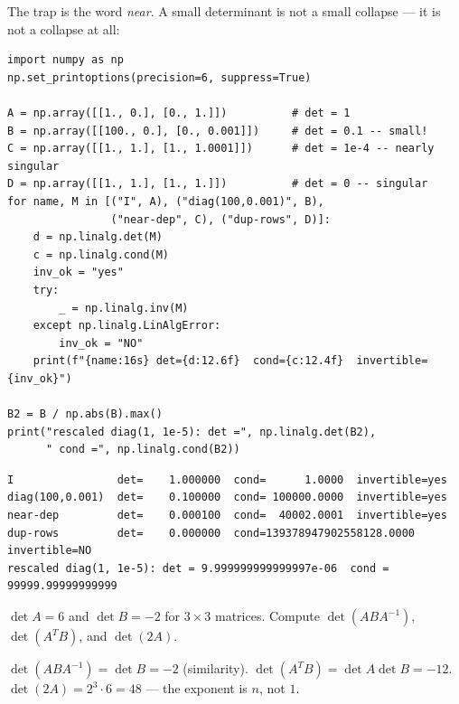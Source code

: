 The trap is the word \emph{near}. A small determinant is not a small
collapse --- it is not a collapse at all:

\begin{lstlisting}[caption={\ttfamily code/ch06\_near\_singular.py ---
four $2\times2$s from ``det $=1$'' to ``det $=0$'', with the condition
number alongside. Watch which quantity actually tracks invertibility.}]
import numpy as np
np.set_printoptions(precision=6, suppress=True)

A = np.array([[1., 0.], [0., 1.]])          # det = 1
B = np.array([[100., 0.], [0., 0.001]])     # det = 0.1 -- small!
C = np.array([[1., 1.], [1., 1.0001]])      # det = 1e-4 -- nearly singular
D = np.array([[1., 1.], [1., 1.]])          # det = 0 -- singular
for name, M in [("I", A), ("diag(100,0.001)", B),
                ("near-dep", C), ("dup-rows", D)]:
    d = np.linalg.det(M)
    c = np.linalg.cond(M)
    inv_ok = "yes"
    try:
        _ = np.linalg.inv(M)
    except np.linalg.LinAlgError:
        inv_ok = "NO"
    print(f"{name:16s} det={d:12.6f}  cond={c:12.4f}  invertible={inv_ok}")

B2 = B / np.abs(B).max()
print("rescaled diag(1, 1e-5): det =", np.linalg.det(B2),
      " cond =", np.linalg.cond(B2))
\end{lstlisting}

\begin{lstlisting}[caption={Output of the near-singular test. Notice
``det $=0.1$'' does not mean safe --- the matrix with det $0.1$ has
condition $10^{5}$, and only the truly singular matrix fails inversion.
Determinant answers \emph{is} it invertible; condition number answers
\emph{how close}.}]
I                det=    1.000000  cond=      1.0000  invertible=yes
diag(100,0.001)  det=    0.100000  cond= 100000.0000  invertible=yes
near-dep         det=    0.000100  cond=  40002.0001  invertible=yes
dup-rows         det=    0.000000  cond=139378947902558128.0000  invertible=NO
rescaled diag(1, 1e-5): det = 9.999999999999997e-06  cond = 99999.99999999999
\end{lstlisting}

\begin{exercise}[medium]\label{ex:det-m1}
$\det A=6$ and $\det B=-2$ for $3\times3$ matrices. Compute
$\det(ABA^{-1})$, $\det(A^{T}B)$, and $\det(2A)$.
\begin{solution}
$\det(ABA^{-1})=\det B=-2$ (similarity). $\det(A^{T}B)=\det A\det B=-12$.
$\det(2A)=2^{3}\cdot6=48$ --- the exponent is $n$, not $1$.
\end{solution}
\end{exercise}


